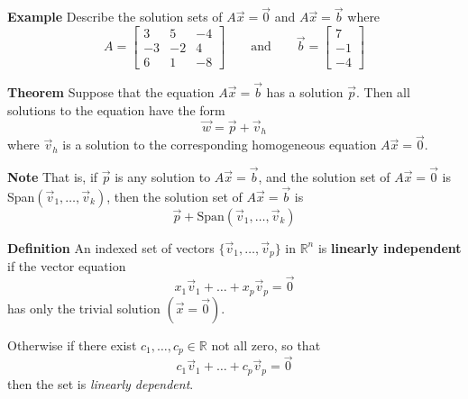   \begin{frame}[fragile]
\textbf{Example}
Describe the solution sets of $A\vec{x}=\vec{0}$ and  $A \vec{x} = \vec{b}$ where 
\[
 A = \left[\begin{array}{rrr}
      3 &  5 &  -4 \\
     -3 & -2 &   4 \\
      6 &  1  &   -8 
     \end{array}\right]
\qquad  \mbox{and} \qquad
\vec{b} = \left[ \begin{array}{r}
                 7 \\ -1 \\ -4
                \end{array}\right]
\]


\end{frame}

  \begin{frame}[fragile]
\textbf{Theorem} Suppose that the equation $A \vec{x} = \vec{b}$ 
has a solution $\vec{p}$.  Then all solutions to the equation have the 
form 
\[
 \vec{w} = \vec{p } + \vec{v}_h
\]
where $\vec{v}_h$ is a solution to the corresponding homogeneous 
equation $A \vec{x} = \vec{0}$.


\textbf{Note}
That is, if $\vec{p}$ is any solution to $A \vec{x} = \vec{b}$,
and the solution set of $A \vec{x} = \vec{0}$ is 
Span$(\vec{v}_1, \dots , \vec{v}_k)$, then the solution set of 
$A \vec{x} = \vec{b}$ is 
\[ \vec{p} + \mbox{Span}(\vec{v}_1, \dots , \vec{v}_k) \]

\end{frame}

  \begin{frame}[fragile]
\textbf{Definition}  An indexed set of vectors 
$\{ \vec{v}_1, \dots , \vec{v}_p \}$ in $\mathbb R^n$ is \textbf{linearly independent}
if the vector equation 
\[
 x_1 \vec{v}_1 + \dots + x_p \vec{v}_p = \vec{0}
\]
has only the trivial solution $(\vec{x} = \vec{0})$.

Otherwise if there exist $c_1,\dots, c_p \in \mathbb R$ not all zero, so that 
\[
 c_1 \vec{v}_1 + \dots + c_p \vec{v}_p = \vec{0}
\]
then the set is {\em linearly dependent}.

\end{frame}

